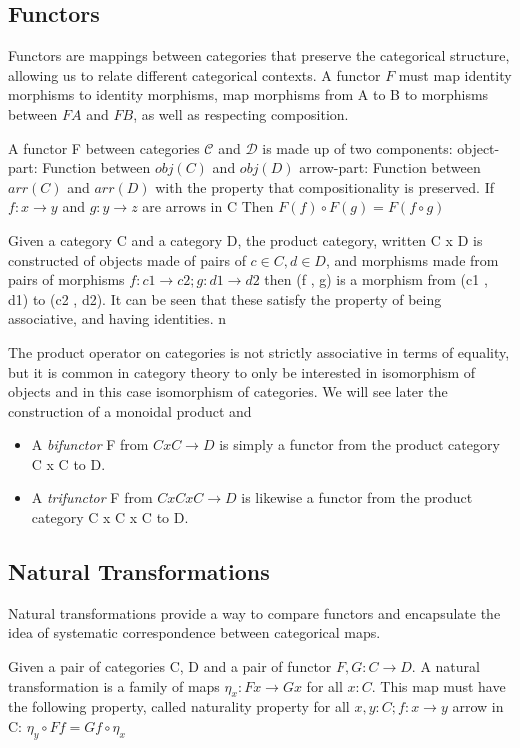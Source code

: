 \subsection{Functors}
Functors are mappings between categories that preserve the categorical
structure, allowing us to relate different categorical contexts. A functor $F$
must map identity morphisms to identity morphisms, map morphisms from
A to B to morphisms between $F A$ and $F B$, as well as respecting composition.
\cite{awodey2010-category-theory-book}
\begin{definition}[Functor] \label{def:functor}
	A functor F between categories $\mathcal{C}$ and $\mathcal{D}$ is made up of two components:
	object-part: Function between $obj(C)$ and $obj(D)$
	arrow-part: Function between $arr(C)$ and $arr(D)$
	with the property that compositionality is preserved.
	If $f : x \to y$ and $g : y \to z$ are arrows in C
	Then $F(f) \circ F(g) = F(f \circ g)$ \cite{awodey2010-category-theory-book}
\end{definition}
\begin{definition}
	Given a category C and a category D, the product category, written C x D is constructed of objects made of pairs of $c \in C, d \in D$, and morphisms made from pairs of morphisms $f : c1 \to c2; g : d1 \to d2$ then (f , g) is a morphism from (c1 , d1) to (c2 , d2).
	It can be seen that these satisfy the property of being associative, and having identities.\cite{leinster2014-basic-category-theory}
n\end{definition}
The product operator on categories is not strictly associative in terms of equality, but it is common in category theory to only be interested in isomorphism of objects and in this case isomorphism of categories. We will see later the construction of a monoidal product and
\begin{definition}[Multifunctor] \label{def:multifunctor}
	\begin{itemize}

		\item A \emph{bifunctor} F from $C x C \to D$ is simply a functor from the product category C x C to D.
		\item A \emph{trifunctor} F from $C x C x C \to D$ is likewise a functor from the product category C x C x C to D.
	\end{itemize} \cite{awodey2010-category-theory-book}
\end{definition}
\subsection{Natural Transformations}\cite{maclane1998-categories-book}
Natural transformations provide a way to compare functors and encapsulate the
idea of systematic correspondence between categorical maps.
\begin{definition}
Given a pair of categories C, D and a pair of functor $F, G : C \to D$.
A natural transformation is a family of maps $\eta_{x} : F x \to G x$ for
all $x : C$.
This map must have the following property, called naturality property for
all $x, y : C; f : x \to y$ arrow in C:
$\eta_y \circ F f = G f \circ \eta_x$
\end{definition}

